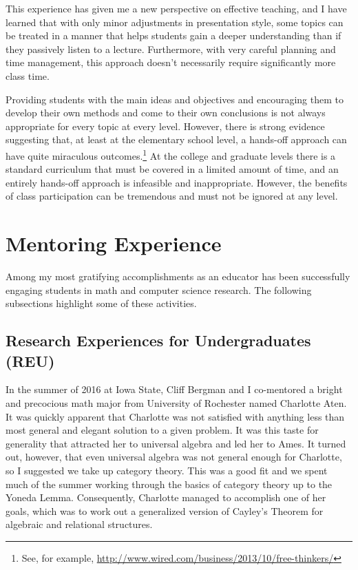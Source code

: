 This experience has given me a new perspective on effective teaching, and I have learned that with only minor adjustments in presentation style, some topics can be treated in a manner that helps students gain a deeper understanding than if they passively listen to a lecture. Furthermore, with very careful planning and time management, this approach doesn't necessarily require significantly more class time.

Providing students with the main ideas and objectives and encouraging them to develop their own methods and come to their own conclusions is not always appropriate for every topic at every level.  However, there is strong evidence suggesting that, at least at the elementary school level, a hands-off approach can have quite miraculous outcomes.\footnote{See, for example, \url{http://www.wired.com/business/2013/10/free-thinkers/}} At the college and graduate levels there is a standard curriculum that must be covered in a limited amount of time, and an entirely hands-off approach is infeasible and inappropriate.  However, the benefits of class participation can be tremendous and must not be ignored at any level.


\newpage

\pagestyle{fancy}\chead{} 
 \lfoot{} \rfoot{\thepage} \cfoot{}

\section{Mentoring Experience} Among my most gratifying accomplishments as an educator has been successfully engaging students in math and computer science research. The following subsections highlight some of these activities.

\newcommand{\advisee}[1]{#1}

\bigskip

\subsection{Research Experiences for Undergraduates (REU)}
In the summer of 2016 at Iowa State, Cliff Bergman and I co-mentored a bright and precocious math major from University of Rochester named \advisee{Charlotte Aten}.  It was quickly apparent that Charlotte was not satisfied with anything less than most general and elegant solution to a given problem. It was this taste for generality that attracted her to universal algebra and led her to Ames. It turned out, however, that even universal algebra was not general enough for Charlotte, so I suggested we take up category theory.  This was a good fit and we spent much of the summer working through the basics of category theory up to the Yoneda Lemma. Consequently, Charlotte managed to accomplish one of her goals, which was to work out a generalized version of Cayley's Theorem for algebraic and relational structures.  

